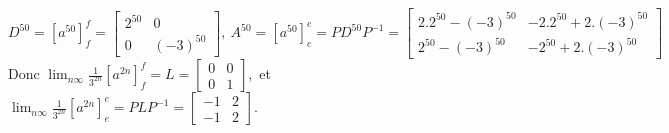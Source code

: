 {{$$D^{50}=[a^{50}]_f^f=\left[\begin{array}{rr}2^{50}&0\\0&(-3)^{50}\end{array}\right],
\ A^{50}=[a^{50}]_e^e=PD^{50}P^{-1}=\left[\begin{array}{rr}
2.2^{50}-(-3)^{50}&-2.2^{50}+2.(-3)^{50}\\2^{50}-(-3)^{50}&-2^{50}+2.(-3)^{50}
\end{array}\right]$$
Donc $\lim_{n\infty}\frac{1}{3^{2n}}[a^{2n}]_f^f=L=
\left[\begin{array}{rr}0&0\\0&1\end{array}\right],$ et
$\lim_{n\infty}\frac{1}{3^{2n}}[a^{2n}]_e^e=PLP^{-1}=\left[\begin{array}{rr}
-1&2\\-1&2\end{array}\right].$}
}